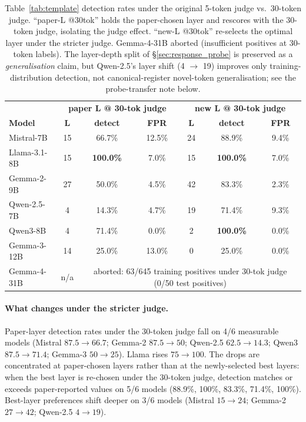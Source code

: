\documentclass{article}
\begin{document}
\begin{table}[H]
\centering
\small
\caption{Table~\ref{tab:template} detection rates under the original 5-token judge vs.\ 30-token judge. ``paper-L @30tok'' holds the paper-chosen layer and rescores with the 30-token judge, isolating the judge effect. ``new-L @30tok'' re-selects the optimal layer under the stricter judge. Gemma-4-31B aborted (insufficient positives at 30-token labels). The layer-depth split of \S\ref{sec:response_probe} is preserved as a \emph{generalisation} claim, but Qwen-2.5's layer shift (4 $\to$ 19) improves only training-distribution detection, not canonical-register novel-token generalisation; see the probe-transfer note below.}
\label{tab:e9_table3}
\begin{tabular}{lccc|ccc}
\toprule
& \multicolumn{3}{c|}{\textbf{paper L @ 30-tok judge}} & \multicolumn{3}{c}{\textbf{new L @ 30-tok judge}} \\
\textbf{Model} & \textbf{L} & \textbf{detect} & \textbf{FPR} & \textbf{L} & \textbf{detect} & \textbf{FPR} \\
\midrule
Mistral-7B     & 15 & 66.7\% & 12.5\% & 24 & 88.9\% & 9.4\% \\
Llama-3.1-8B   & 15 & \textbf{100.0\%} & 7.0\% & 15 & \textbf{100.0\%} & 7.0\% \\
Gemma-2-9B     & 27 & 50.0\% & 4.5\% & 42 & 83.3\% & 2.3\% \\
Qwen-2.5-7B    & 4  & 14.3\% & 4.7\% & 19 & 71.4\% & 9.3\% \\
Qwen3-8B       & 4  & 71.4\% & 0.0\% & 2  & \textbf{100.0\%} & 0.0\% \\
Gemma-3-12B    & 14 & 25.0\% & 13.0\% & 0  & 25.0\% & 0.0\% \\
Gemma-4-31B    & n/a & \multicolumn{5}{c}{aborted: 63/645 training positives under 30-tok judge (0/50 test positives)} \\
\bottomrule
\end{tabular}
\end{table}

\paragraph{What changes under the stricter judge.} Paper-layer detection rates under the 30-token judge fall on 4/6 measurable models (Mistral $87.5\to 66.7$; Gemma-2 $87.5 \to 50$; Qwen-2.5 $62.5\to 14.3$; Qwen3 $87.5\to 71.4$; Gemma-3 $50\to 25$). Llama rises $75\to 100$. The drops are concentrated at paper-chosen layers rather than at the newly-selected best layers: when the best layer is re-chosen under the 30-token judge, detection matches or exceeds paper-reported values on 5/6 models (88.9\%, 100\%, 83.3\%, 71.4\%, 100\%). Best-layer preferences shift deeper on 3/6 models (Mistral $15\to 24$; Gemma-2 $27\to 42$; Qwen-2.5 $4\to 19$).
\end{document}
